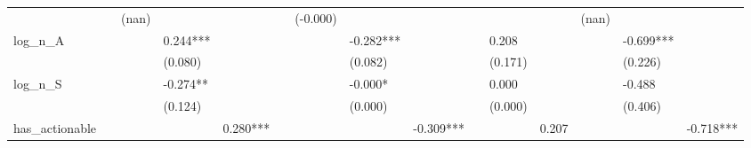 \begin{table}
\begin{center}
\begin{tabular}{lllllllllllllll}
                  &                    & (nan)              &                        &                     &                      & (-0.000)             &                          &                       &                      &                          &                       & (nan)                         &                                           &                                         \\
log\_n\_A         &                    &                    & 0.244***               &                     &                      &                      & -0.282***                &                       &                      & 0.208                    &                       &                               & -0.699***                                 &                                         \\
                  &                    &                    & (0.080)                &                     &                      &                      & (0.082)                  &                       &                      & (0.171)                  &                       &                               & (0.226)                                   &                                         \\
log\_n\_S         &                    &                    & -0.274**               &                     &                      &                      & -0.000*                  &                       &                      & 0.000                    &                       &                               & -0.488                                    &                                         \\
                  &                    &                    & (0.124)                &                     &                      &                      & (0.000)                  &                       &                      & (0.000)                  &                       &                               & (0.406)                                   &                                         \\
has\_actionable   &                    &                    &                        & 0.280***            &                      &                      &                          & -0.309***             &                      &                          & 0.207                 &                               &                                           & -0.718***                               \\

\end{tabular}
\end{center}
\end{table}

